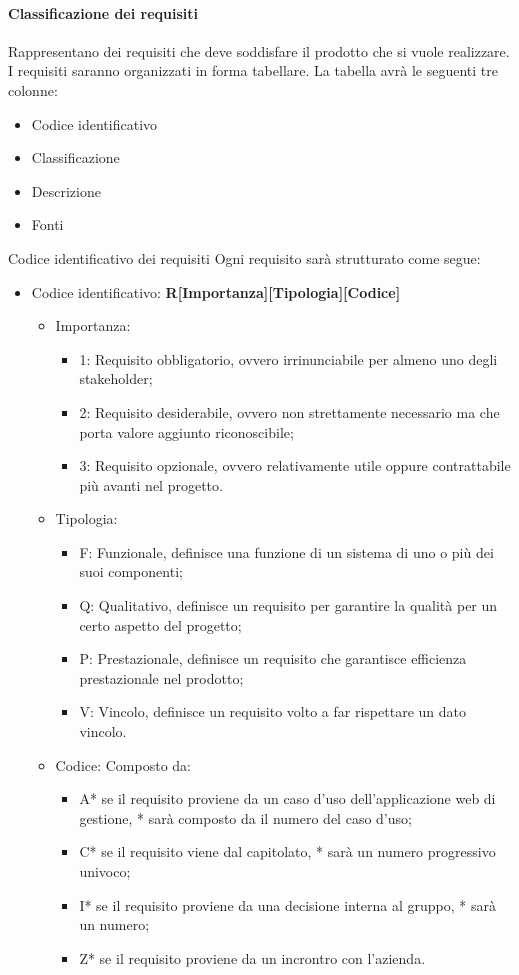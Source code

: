 \paragraph{Classificazione dei requisiti}
Rappresentano dei requisiti che deve soddisfare il prodotto che si vuole realizzare. I requisiti saranno
organizzati in forma tabellare. La tabella avrà le seguenti tre colonne:
\begin{itemize}
\item Codice identificativo
\item Classificazione
\item Descrizione
\item Fonti
\end{itemize}
Codice identificativo dei requisiti Ogni requisito sarà strutturato come segue:
\begin{itemize}
\item Codice identificativo: \textbf{R[Importanza][Tipologia][Codice]}
\begin{itemize}

\item Importanza:
\begin{itemize}
\item 1: Requisito obbligatorio, ovvero irrinunciabile per almeno uno degli stakeholder;
\item 2: Requisito desiderabile, ovvero non strettamente necessario ma che porta valore aggiunto riconoscibile;
\item 3: Requisito opzionale, ovvero relativamente utile oppure contrattabile più avanti nel progetto.
\end{itemize}

\item Tipologia:
\begin{itemize}
\item  F: Funzionale, definisce una funzione di un sistema di uno o più dei suoi componenti;
\item Q: Qualitativo, definisce un requisito per garantire la qualità per un certo aspetto del progetto;
\item P: Prestazionale, definisce un requisito che garantisce efficienza prestazionale nel prodotto;
\item V: Vincolo, definisce un requisito volto a far rispettare un dato vincolo.
\end{itemize}

\item Codice: Composto da:
\begin{itemize}
\item A* se il requisito proviene da un caso d’uso dell’applicazione web di gestione, * sarà composto da il numero del caso d’uso;
\item C* se il requisito viene dal capitolato, * sarà un numero progressivo univoco;
\item I* se il requisito proviene da una decisione interna al gruppo, * sarà un numero;
\item Z* se il requisito proviene da un incrontro con l’azienda.
\end{itemize}


\end{itemize}
\end{itemize}
